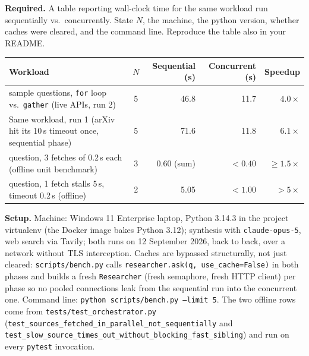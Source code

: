 \documentclass[11pt,a4paper]{article}
\begin{document}
\begin{deliverbox}
\textbf{Required.} A table reporting wall-clock time for the same workload run sequentially vs.\ concurrently. State $N$, the machine, the python version, whether caches were cleared, and the command line. Reproduce the table also in your README.
\end{deliverbox}

\begin{center}\small
\begin{tabularx}{\textwidth}{@{}>{\RaggedRight\arraybackslash}X c r r r@{}}
\toprule
\textbf{Workload} & $N$ & \textbf{Sequential (s)} & \textbf{Concurrent (s)} & \textbf{Speedup} \\
\midrule
5 sample questions, \texttt{for} loop vs.\ \texttt{gather} (live APIs, run 2) & 5 & 46.8 & 11.7 & $4.0\times$ \\
Same workload, run 1 (arXiv hit its 10\,s timeout once, sequential phase) & 5 & 71.6 & 11.8 & $6.1\times$ \\
1 question, 3 fetches of 0.2\,s each (offline unit benchmark) & 3 & 0.60 (sum) & $<0.40$ & $\geq 1.5\times$ \\
1 question, 1 fetch stalls 5\,s, timeout 0.2\,s (offline) & 2 & 5.05 & $<1.00$ & $>5\times$ \\
\bottomrule
\end{tabularx}
\end{center}

\textbf{Setup.} Machine: Windows 11 Enterprise laptop, Python 3.14.3 in the project virtualenv (the Docker image bakes Python 3.12); synthesis with \texttt{claude-opus-5}, web search via Tavily; both runs on 12 September 2026, back to back, over a network without TLS interception. Caches are bypassed structurally, not just cleared: \texttt{scripts/bench.py} calls \texttt{researcher.ask(q, use\_cache=False)} in both phases and builds a fresh \texttt{Researcher} (fresh semaphore, fresh HTTP client) per phase so no pooled connections leak from the sequential run into the concurrent one. Command line: \texttt{python scripts/bench.py --limit 5}. The two offline rows come from \texttt{tests/test\_orchestrator.py} (\texttt{test\_sources\_fetched\_in\_parallel\_not\_sequentially} and \texttt{test\_slow\_source\_times\_out\_without\_blocking\_fast\_sibling}) and run on every \texttt{pytest} invocation.
\end{document}
